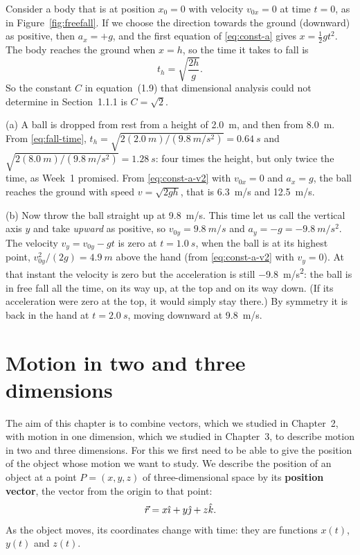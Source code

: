 \documentclass[11pt,a4paper]{article}
\begin{document}
Consider a body that is at position $x_0 = 0$ with velocity $v_{0x} = 0$ at time $t = 0$, as in
Figure~\ref{fig:freefall}. If we choose the direction towards the ground (downward) as positive,
then $a_x = +g$, and the first equation of \eqref{eq:const-a} gives $x = \frac12 gt^2$. The body
reaches the ground when $x = h$, so the time it takes to fall is
\begin{equation}\label{eq:fall-time}
  t_h = \sqrt{\frac{2h}{g}} .
\end{equation}
So the constant $C$ in equation~(1.9) that dimensional analysis could not determine in
Section~1.1.1 is $C = \sqrt{2}$.

\begin{example}
(a) A ball is dropped from rest from a height of \qty{2.0}{m}, and then from \qty{8.0}{m}. From
\eqref{eq:fall-time}, $t_h = \sqrt{2(\qty{2.0}{m})/(\qty{9.8}{m/s^2})} = \qty{0.64}{s}$ and
$\sqrt{2(\qty{8.0}{m})/(\qty{9.8}{m/s^2})} = \qty{1.28}{s}$: four times the height, but only twice
the time, as Week~1 promised. From \eqref{eq:const-a-v2} with $v_{0x} = 0$ and $a_x = g$, the ball
reaches the ground with speed $v = \sqrt{2gh}$, that is \qty{6.3}{m/s} and \qty{12.5}{m/s}.

(b) Now throw the ball straight up at \qty{9.8}{m/s}. This time let us call the vertical axis $y$
and take \emph{upward} as positive, so $v_{0y} = \qty{+9.8}{m/s}$ and $a_y = -g =
\qty{-9.8}{m/s^2}$. The velocity $v_y = v_{0y} - gt$ is zero at $t = \qty{1.0}{s}$, when the ball
is at its highest point, $v_{0y}^2/(2g) = \qty{4.9}{m}$ above the hand (from
\eqref{eq:const-a-v2} with $v_y = 0$). At that instant the velocity is zero but the acceleration
is still \qty{-9.8}{m/s^2}: the ball is in free fall all the time, on its way up, at the top and on
its way down. (If its acceleration were zero at the top, it would simply stay there.) By symmetry
it is back in the hand at $t = \qty{2.0}{s}$, moving downward at \qty{9.8}{m/s}.
\end{example}

\setcounter{section}{3}
\section{Motion in two and three dimensions}\label{sec:3d}

The aim of this chapter is to combine vectors, which we studied in Chapter~2, with motion in one
dimension, which we studied in Chapter~3, to describe motion in two and three dimensions. For this
we first need to be able to give the position of the object whose motion we want to study. We
describe the position of an object at a point $P = (x, y, z)$ of three-dimensional space by
its \textbf{position vector}, the vector from the origin to that point:
\begin{equation}\label{eq:r}
  \vec{r} = x\hat{\imath} + y\hat{\jmath} + z\hat{k} .
\end{equation}
As the object moves, its coordinates change with time: they are functions $x(t)$, $y(t)$ and
$z(t)$.
\end{document}
